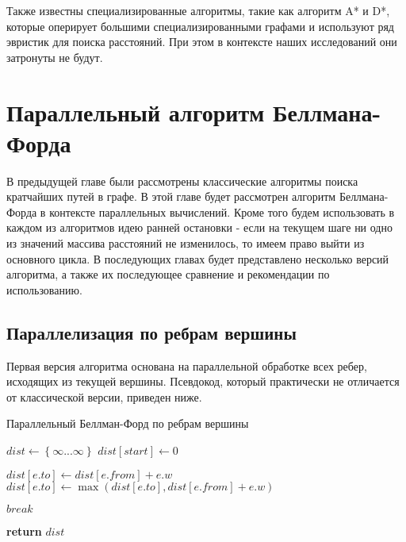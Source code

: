 Также известны специализированные алгоритмы, такие как алгоритм A* и D*, которые оперирует большими специализированными графами и используют ряд эвристик для поиска расстояний. При этом в контексте наших исследований они затронуты не будут.

\FloatBarrier
\section{Параллельный алгоритм Беллмана-Форда}

В предыдущей главе были рассмотрены классические алгоритмы поиска кратчайших путей в графе. В этой главе будет рассмотрен алгоритм Беллмана-Форда в контексте параллельных вычислений. Кроме того будем использовать в каждом из алгоритмов идею ранней остановки - если на текущем шаге ни одно из значений массива расстояний не изменилось, то имеем право выйти из основного цикла. В последующих главах будет представлено несколько версий алгоритма, а также их последующее сравнение и рекомендации по использованию.  

\FloatBarrier
\subsection{Параллелизация по ребрам вершины}
Первая версия алгоритма основана на параллельной обработке всех ребер, исходящих из текущей вершины. Псевдокод, который практически не отличается от классической версии, приведен ниже. 


\FloatBarrier
\begin{algorithm}
\caption{Параллельный Беллман-Форд по ребрам вершины}\label{bf_classic_par1}
\begin{algorithmic}[1]
\State $dist\gets \left\{ {\infty ... \infty}\right\}$
\State $dist[start] \gets 0$
 
		\algrenewcommand{}
				\State $dist[e.to] \gets dist[e.from] + e.w$
			\EndIf
			\State $dist[e.to] \gets \max(dist[e.to], dist[e.from] + e.w)$
		\EndFor	
		\algrenewcommand{}

	\EndFor
		\State $break$
	\EndIf

\EndFor
\State \textbf{return} $dist$
\EndProcedure
\end{algorithmic}
\end{algorithm}

